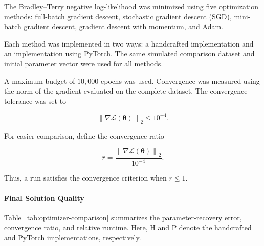 \documentclass[11pt,a4paper]{article}
\begin{document}
The Bradley--Terry negative log-likelihood was minimized using five
optimization methods: full-batch gradient descent, stochastic gradient
descent (SGD), mini-batch gradient descent, gradient descent with
momentum, and Adam.

Each method was implemented in two ways: a handcrafted implementation
and an implementation using PyTorch. The same simulated comparison
dataset and initial parameter vector were used for all methods.

A maximum budget of \(10{,}000\) epochs was used. Convergence was
measured using the norm of the gradient evaluated on the complete
dataset. The convergence tolerance was set to

\begin{equation}
    \left\lVert \nabla \mathcal{L}(\boldsymbol{\theta}) \right\rVert_2
    \leq 10^{-4}.
\end{equation}

For easier comparison, define the convergence ratio

\begin{equation}
    r
    =
    \frac{
        \left\lVert
        \nabla \mathcal{L}(\boldsymbol{\theta})
        \right\rVert_2
    }{
        10^{-4}
    }.
\end{equation}

Thus, a run satisfies the convergence criterion when \(r\leq 1\).

\paragraph{Final Solution Quality}

Table~\ref{tab:optimizer-comparison} summarizes the parameter-recovery
error, convergence ratio, and relative runtime. Here, H and P denote
the handcrafted and PyTorch implementations, respectively.
\end{document}
